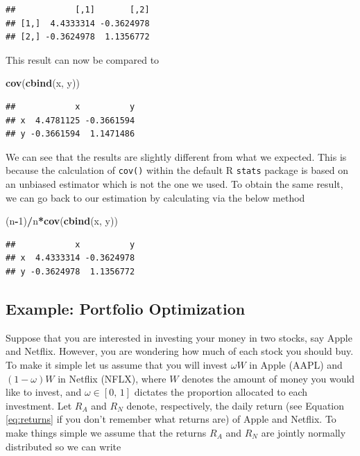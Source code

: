 \documentclass[12pt,]{krantz}
\newenvironment{Shaded}{\begin{snugshade}}{\end{snugshade}}
\newcommand{\KeywordTok}[1]{\textcolor[rgb]{0.27,0.27,0.27}{\textbf{#1}}}
\newcommand{\DecValTok}[1]{\textcolor[rgb]{0.06,0.06,0.06}{#1}}
\newcommand{\OperatorTok}[1]{\textcolor[rgb]{0.43,0.43,0.43}{\textbf{#1}}}
\newcommand{\NormalTok}[1]{#1}
\begin{document}
\begin{verbatim}
##            [,1]       [,2]
## [1,]  4.4333314 -0.3624978
## [2,] -0.3624978  1.1356772
\end{verbatim}

This result can now be compared to

\begin{Shaded}
\begin{Highlighting}[]
\KeywordTok{cov}\NormalTok{(}\KeywordTok{cbind}\NormalTok{(x, y))}
\end{Highlighting}
\end{Shaded}

\begin{verbatim}
##            x          y
## x  4.4781125 -0.3661594
## y -0.3661594  1.1471486
\end{verbatim}

We can see that the results are slightly different from what we
expected. This is because the calculation of \texttt{cov()} within the
default R \texttt{stats} package is based on an unbiased estimator which
is not the one we used. To obtain the same result, we can go back to our
estimation by calculating via the below method

\begin{Shaded}
\begin{Highlighting}[]
\NormalTok{(n}\OperatorTok{-}\DecValTok{1}\NormalTok{)}\OperatorTok{/}\NormalTok{n}\OperatorTok{*}\KeywordTok{cov}\NormalTok{(}\KeywordTok{cbind}\NormalTok{(x, y))}
\end{Highlighting}
\end{Shaded}

\begin{verbatim}
##            x          y
## x  4.4333314 -0.3624978
## y -0.3624978  1.1356772
\end{verbatim}

\subsection{Example: Portfolio
Optimization}\label{example-portfolio-optimization}

Suppose that you are interested in investing your money in two stocks,
say Apple and Netflix. However, you are wondering how much of each stock
you should buy. To make it simple let us assume that you will invest
\(\omega W\) in Apple (AAPL) and \((1-\omega) W\) in Netflix (NFLX),
where \(W\) denotes the amount of money you would like to invest, and
\(\omega \in [0, \, 1]\) dictates the proportion allocated to each
investment. Let \(R_A\) and \(R_N\) denote, respectively, the daily
return (see Equation \eqref{eq:returns} if you don't remember what returns
are) of Apple and Netflix. To make things simple we assume that the
returns \(R_A\) and \(R_N\) are jointly normally distributed so we can
write
\end{document}
